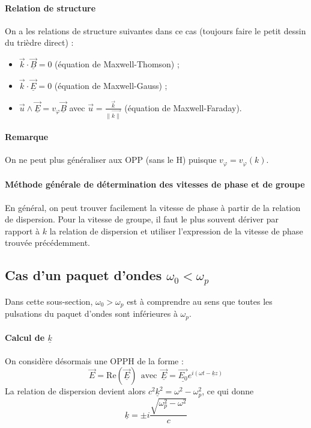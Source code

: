 \documentclass[french]{book}
\theoremstyle{plain}
\theoremstyle{definition}
\theoremstyle{remark}
\begin{document}
\paragraph{Relation de structure} On a les relations de structure suivantes dans ce cas (toujours faire le petit dessin du trièdre direct) :
\begin{itemize}
	\item $\overrightarrow{k}\cdot\underline{\overrightarrow{B}}=0$ (équation de Maxwell-Thomson) ;
	\item $\overrightarrow{k}\cdot\underline{\overrightarrow{E}}=0$ (équation de Maxwell-Gauss) ;
	\item $\overrightarrow{u}\wedge\underline{\overrightarrow{E}}=v_\varphi\underline{\overrightarrow{B}}$ avec $\overrightarrow{u}=\displaystyle\frac{\overrightarrow{k}}{\lVert\overrightarrow{k\rVert}}$ (équation de Maxwell-Faraday).
\end{itemize}
\paragraph{Remarque} On ne peut plus généraliser aux OPP (sans le H) puisque $v_\varphi=v_\varphi(k)$.
\paragraph{Méthode générale de détermination des vitesses de phase et de groupe} En général, on peut trouver facilement la vitesse de phase à partir de la relation de dispersion. Pour la vitesse de groupe, il faut le plus souvent dériver par rapport à $k$ la relation de dispersion et utiliser l'expression de la vitesse de phase trouvée précédemment.
\subsection{Cas d'un paquet d'ondes $\omega_0<\omega_p$}
Dans cette sous-section, $\omega_0>\omega_p$ est à comprendre au sens que toutes les pulsations du paquet d'ondes sont inférieures à $\omega_p$.
\paragraph{Calcul de $\underline{k}$} On considère désormais une OPPH de la forme : $$\overrightarrow{E}=\text{Re}(\underline{\overrightarrow{E}}) \ \ \text{avec} \ \ \underline{\overrightarrow{E}}=\underline{\overrightarrow{E_0}}e^{i(\omega t-\underline{k}z)}$$ La relation de dispersion devient alors $c^2\underline{k}^2=\omega^2-\omega_p^2$, ce qui donne $$\underline{k}=\pm i \frac{\sqrt{\omega_p^2-\omega^2}}{c}$$
\end{document}
